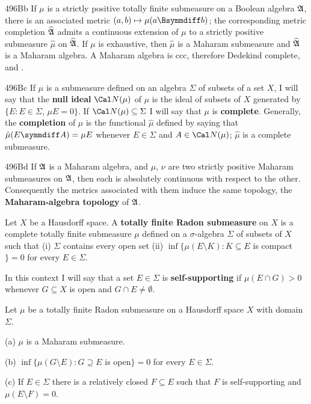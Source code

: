 \spheader 496Bb If $\mu$ is a strictly positive totally finite submeasure
on a Boolean algebra $\frak A$, there is an associated metric
$(a,b)\mapsto\mu(a\Bsymmdiff b)$;
the corresponding metric completion $\widehat{\frak A}$ admits a continuous
extension of $\mu$ to a strictly positive submeasure $\hat\mu$ on
$\widehat{\frak A}$.   If $\mu$ is exhaustive, then $\hat\mu$ is a Maharam
submeasure and $\widehat{\frak A}$ is a Maharam
algebra.
A Maharam algebra is ccc, therefore Dedekind
complete, and \wsid{}.

\spheader 496Bc If $\mu$ is a submeasure defined on an algebra
$\Sigma$ of subsets of a set $X$, I will say that the {\bf null ideal}
$\Cal N(\mu)$ of $\mu$ is
the ideal of subsets of $X$ generated by $\{E:E\in\Sigma$, $\mu E=0\}$.
If $\Cal N(\mu)\subseteq\Sigma$ I will say that $\mu$ is {\bf complete}.
Generally,
the {\bf completion} of $\mu$ is the functional $\hat\mu$ defined by saying
that $\hat\mu(E\symmdiff A)=\mu E$ whenever $E\in\Sigma$ and
$A\in\Cal N(\mu)$; $\hat\mu$ is a
complete submeasure.

\spheader 496Bd If $\frak A$ is a Maharam algebra, and $\mu$, $\nu$ are two
strictly positive Maharam submeasures on $\frak A$, then each is absolutely
continuous with respect to the other.
Consequently the metrics associated with them induce the same topology, the {\bf Maharam-algebra
topology} of $\frak A$.

 Let $X$ be a Hausdorff space.
A {\bf totally finite Radon submeasure} on $X$ is a complete totally finite submeasure
$\mu$ defined on a $\sigma$-algebra $\Sigma$ of subsets of $X$
such that (i) $\Sigma$ contains every open set (ii)
$\inf\{\mu(E\setminus K):K\subseteq E$ is compact$\}=0$
for every $E\in\Sigma$.

In this context I
will say that a set $E\in\Sigma$ is {\bf self-supporting} if
$\mu(E\cap G)>0$ whenever $G\subseteq X$ is open and $G\cap E\ne\emptyset$.

Let $\mu$ be a totally finite Radon submeasure on a Hausdorff space $X$ with domain
$\Sigma$.

(a) $\mu$ is a Maharam submeasure.

(b) $\inf\{\mu(G\setminus E):G\supseteq E$ is open$\}=0$ for every
$E\in\Sigma$.

(c) If $E\in\Sigma$ there is a relatively closed $F\subseteq E$ such that
$F$ is self-supporting and $\mu(E\setminus F)=0$.

